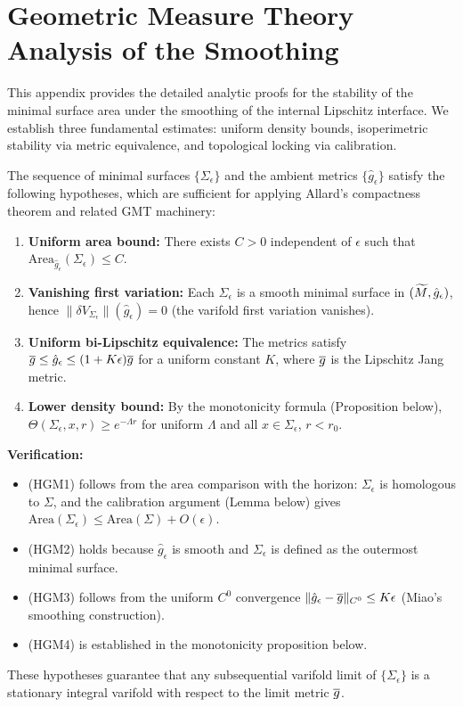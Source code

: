 \section{Geometric Measure Theory Analysis of the Smoothing}
\label{app:GMT}

This appendix provides the detailed analytic proofs for the stability of the minimal surface area under the smoothing of the internal Lipschitz interface. We establish three fundamental estimates: uniform density bounds, isoperimetric stability via metric equivalence, and topological locking via calibration.

\begin{lemma}\label{lem:GMTHypotheses}
The sequence of minimal surfaces $\{\Sigma_\epsilon\}$ and the ambient metrics $\{\hat{g}_\epsilon\}$ satisfy the following hypotheses, which are sufficient for applying Allard's compactness theorem and related GMT machinery:
\begin{enumerate}
    \item[\textup{(HGM1)}] \textbf{Uniform area bound:} There exists $C > 0$ independent of $\epsilon$ such that $\mathrm{Area}_{\hat{g}_\epsilon}(\Sigma_\epsilon) \le C$.
    \item[\textup{(HGM2)}] \textbf{Vanishing first variation:} Each $\Sigma_\epsilon$ is a smooth minimal surface in $(\widetilde{M}, \hat{g}_\epsilon)$, hence $\|\delta V_{\Sigma_\epsilon}\|(\hat{g}_\epsilon) = 0$ (the varifold first variation vanishes).
    \item[\textup{(HGM3)}] \textbf{Uniform bi-Lipschitz equivalence:} The metrics satisfy $\overline{g} \le \hat{g}_\epsilon \le (1 + K\epsilon)\overline{g}$ for a uniform constant $K$, where $\overline{g}$ is the Lipschitz Jang metric.
    \item[\textup{(HGM4)}] \textbf{Lower density bound:} By the monotonicity formula (Proposition below), $\Theta(\Sigma_\epsilon, x, r) \ge e^{-\Lambda r}$ for uniform $\Lambda$ and all $x \in \Sigma_\epsilon$, $r < r_0$.
\end{enumerate}

\textbf{Verification:}
\begin{itemize}
    \item (HGM1) follows from the area comparison with the horizon: $\Sigma_\epsilon$ is homologous to $\Sigma$, and the calibration argument (Lemma below) gives $\mathrm{Area}(\Sigma_\epsilon) \le \mathrm{Area}(\Sigma) + O(\epsilon)$.
    \item (HGM2) holds because $\hat{g}_\epsilon$ is smooth and $\Sigma_\epsilon$ is defined as the outermost minimal surface.
    \item (HGM3) follows from the uniform $C^0$ convergence $\|\hat{g}_\epsilon - \overline{g}\|_{C^0} \le K\epsilon$ (Miao's smoothing construction).
    \item (HGM4) is established in the monotonicity proposition below.
\end{itemize}
These hypotheses guarantee that any subsequential varifold limit of $\{\Sigma_\epsilon\}$ is a stationary integral varifold with respect to the limit metric $\overline{g}$.
\end{lemma}

